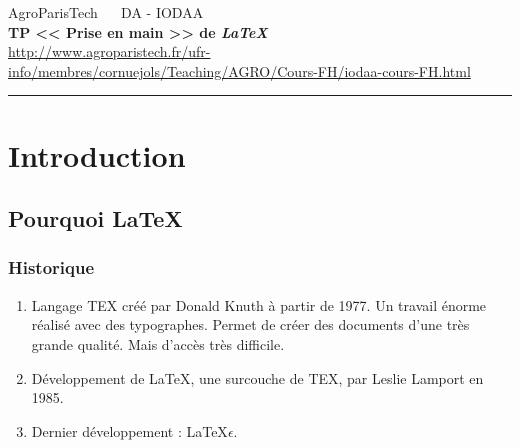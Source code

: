 \documentclass[a4paper, french]{article}
\begin{document}
\begin{center}
\large
AgroParisTech ~~  DA - IODAA  \medskip\\ 
\Large
{\bf TP  << Prise en main >>  de  \textit{\LaTeX}} \\ %
\vspace{0.4cm}
\small
\url{http://www.agroparistech.fr/ufr-info/membres/cornuejols/Teaching/AGRO/Cours-FH/iodaa-cours-FH.html}
\end{center}
\hrule

\noindent



\section{Introduction} 
\label{sec_intro}

\subsection{Pourquoi \LaTeX} 

\subsubsection{Historique} 

\begin{enumerate}

   \item Langage TEX créé par Donald Knuth à partir de 1977. Un travail énorme réalisé avec des typographes. Permet de créer des documents d’une très grande qualité. Mais d’accès très difficile.

   \item Développement de LaTeX, une surcouche de TEX, par Leslie Lamport en 1985.

   \item Dernier développement : LaTeX$\epsilon$.

\end{enumerate}
\end{document}
